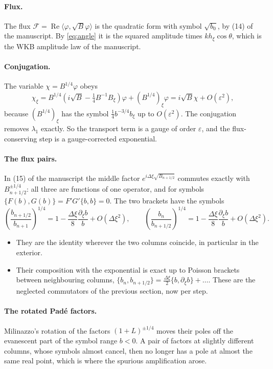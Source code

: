 \documentclass[11pt]{article}
\newcommand{\pd}{\partial}
\begin{document}
\paragraph{Flux.} The flux $\mathcal F=\operatorname{Re}\langle\varphi,\sqrt
B\varphi\rangle$ is the quadratic form with symbol $\sqrt{b_0}$, by (14) of the
manuscript. By \eqref{eq:angle} it is the squared amplitude times
$kh_\xi\cos\theta$, which is the WKB amplitude law of the manuscript.

\paragraph{Conjugation.} The variable $\chi=B^{1/4}\varphi$ obeys
\[
\chi_\xi=B^{1/4}\left(i\sqrt B-\tfrac14B^{-1}B_\xi\right)\varphi+\left(B^{1/4}\right)_\xi\varphi
=i\sqrt B\chi+O(\varepsilon^2),
\]
because $(B^{1/4})_\xi$ has the symbol $\tfrac14b^{-3/4}b_\xi$ up to
$O(\varepsilon^2)$. The conjugation removes $\lambda_1$ exactly. So the
transport term is a gauge of order $\varepsilon$, and the flux-conserving step
is a gauge-corrected exponential.

\paragraph{The flux pairs.} In (15) of the manuscript the middle factor
$e^{i\Delta\xi\sqrt{B_{n+1/2}}}$ commutes exactly with $B_{n+1/2}^{\pm1/4}$: all
three are functions of one operator, and for symbols $\{F(b),G(b)\}=F'G'\{b,b\}=0$.
The two brackets have the symbols
\[
\left(\frac{b_{n+1/2}}{b_{n+1}}\right)^{1/4}=1-\frac{\Delta\xi}8\frac{\pd_\xi b}{b}+O(\Delta\xi^2),\qquad
\left(\frac{b_n}{b_{n+1/2}}\right)^{1/4}=1-\frac{\Delta\xi}8\frac{\pd_\xi b}{b}+O(\Delta\xi^2).
\]
\begin{itemize}
\item They are the identity wherever the two columns coincide, in particular in
  the exterior.
\item Their composition with the exponential is exact up to Poisson brackets
  between neighbouring columns,
  $\{b_n,b_{n+1/2}\}=\tfrac{\Delta\xi}2\{b,\pd_\xi b\}+\dots$. These are the
  neglected commutators of the previous section, now per step.
\end{itemize}

\paragraph{The rotated Padé factors.} Milinazzo's rotation of the factors
$(1+L)^{\pm1/4}$ moves their poles off the evanescent part of the symbol range
$b<0$. A pair of factors at slightly different columns, whose symbols almost
cancel, then no longer has a pole at almost the same real point, which is where
the spurious amplification arose.
\end{document}
